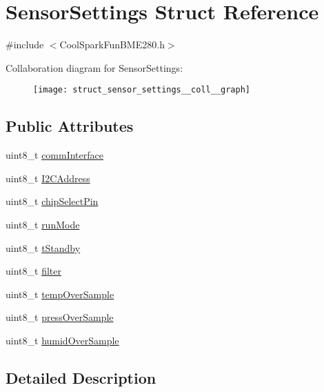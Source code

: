\hypertarget{struct_sensor_settings}{}\section{Sensor\+Settings Struct Reference}
\label{struct_sensor_settings}


{\ttfamily \#include $<$Cool\+Spark\+Fun\+B\+M\+E280.\+h$>$}



Collaboration diagram for Sensor\+Settings\+:\nopagebreak
\begin{figure}[H]
\begin{center}
\leavevmode
\texttt{[image: struct\_sensor\_settings\_\_coll\_\_graph]}
\end{center}
\end{figure}
\subsection*{Public Attributes}
\begin{DoxyCompactItemize}
\item 
uint8\+\_\+t \hyperlink{struct_sensor_settings_a5bf116387c543a6ea5732976424e8cb1}{comm\+Interface}
\item 
uint8\+\_\+t \hyperlink{struct_sensor_settings_af8103021dbce7e5ee6d786c4893324f7}{I2\+C\+Address}
\item 
uint8\+\_\+t \hyperlink{struct_sensor_settings_abe2de606ebb580ad81e3fafb1a454580}{chip\+Select\+Pin}
\item 
uint8\+\_\+t \hyperlink{struct_sensor_settings_a0ffbdf34f4c23a2a167f00e4cb971dec}{run\+Mode}
\item 
uint8\+\_\+t \hyperlink{struct_sensor_settings_a7098be3c1df0271dc9bc0fb45c1e9bb9}{t\+Standby}
\item 
uint8\+\_\+t \hyperlink{struct_sensor_settings_a69dc95368069a0f408a141d4c2cbf045}{filter}
\item 
uint8\+\_\+t \hyperlink{struct_sensor_settings_abdedc9d05f4850c58005313486958073}{temp\+Over\+Sample}
\item 
uint8\+\_\+t \hyperlink{struct_sensor_settings_a85ba10cad25b479bba9cb42c6400ab21}{press\+Over\+Sample}
\item 
uint8\+\_\+t \hyperlink{struct_sensor_settings_a4a02fc7708071b88ccf610e3f7ed9d55}{humid\+Over\+Sample}
\end{DoxyCompactItemize}


\subsection{Detailed Description}


